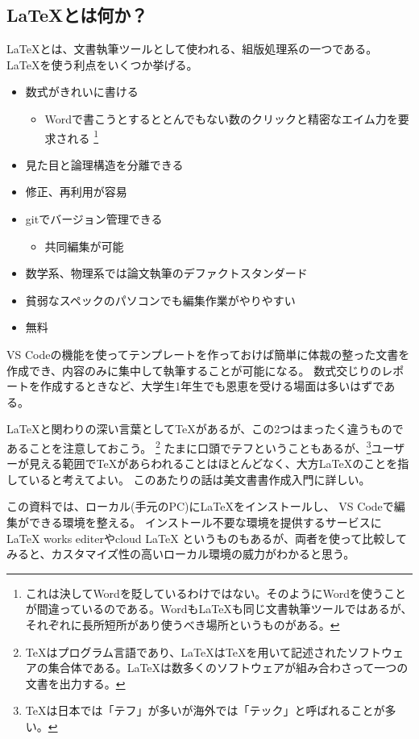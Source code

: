 \documentclass[titlepage]{ltjsarticle}
\begin{document}
\subsection{\LaTeX とは何か？}
\LaTeX とは、文書執筆ツールとして使われる、組版処理系の一つである。
\LaTeX を使う利点をいくつか挙げる。
\begin{itemize}
  \item 数式がきれいに書ける
        \begin{itemize}
          \item Wordで書こうとするととんでもない数のクリックと精密なエイム力を要求される
                \footnote{これは決してWordを貶しているわけではない。そのようにWordを使うことが間違っているのである。Wordも\LaTeX も同じ文書執筆ツールではあるが、それぞれに長所短所があり使うべき場所というものがある。}
        \end{itemize}
  \item 見た目と論理構造を分離できる
  \item 修正、再利用が容易
  \item gitでバージョン管理できる
        \begin{itemize}
          \item 共同編集が可能
        \end{itemize}
  \item 数学系、物理系では論文執筆のデファクトスタンダード
  \item 貧弱なスペックのパソコンでも編集作業がやりやすい
  \item 無料
\end{itemize}
VS Codeの機能を使ってテンプレートを作っておけば簡単に体裁の整った文書を作成でき、内容のみに集中して執筆することが可能になる。
数式交じりのレポートを作成するときなど、大学生1年生でも恩恵を受ける場面は多いはずである。

\LaTeX と関わりの深い言葉として\TeX があるが、この2つはまったく違うものであることを注意しておこう。
\footnote{\TeX \index{\TeX}はプログラム言語であり、\LaTeX は\TeX を用いて記述されたソフトウェアの集合体である。\LaTeX は数多くのソフトウェアが組み合わさって一つの文書を出力する。}
たまに口頭でテフということもあるが、\footnote{\TeX は日本では「テフ」が多いが海外では「テック」と呼ばれることが多い。}ユーザーが見える範囲で\TeX があらわれることはほとんどなく、大方\LaTeX のことを指していると考えてよい。
このあたりの話は美文書書作成入門\cite{美文書本}に詳しい。

この資料では、ローカル(手元のPC)に\LaTeX をインストールし、
VS Codeで編集ができる環境を整える。
インストール不要な環境を提供するサービスにLaTeX works editerやcloud LaTeX というものもあるが、両者を使って比較してみると、カスタマイズ性の高いローカル環境の威力がわかると思う。
\end{document}
